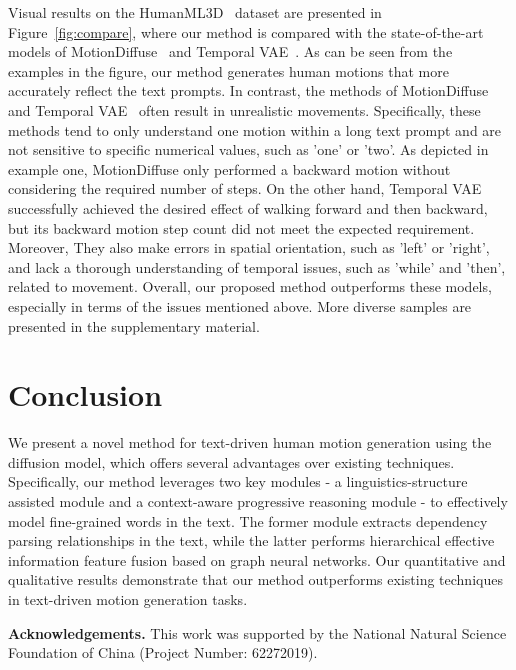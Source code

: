 \documentclass[10pt,twocolumn,letterpaper]{article}
\begin{document}
Visual results on the HumanML3D~\cite{guo2022generating} dataset are presented in Figure~\ref{fig:compare}, where our method is compared with the state-of-the-art models of MotionDiffuse~\cite{zhang2022motiondiffuse} and Temporal VAE~\cite{guo2022generating}. As can be seen from the examples in the figure, our method generates human motions that more accurately reflect the text prompts. In contrast, the methods of MotionDiffuse~\cite{zhang2022motiondiffuse} and Temporal VAE~\cite{guo2022generating} often result in unrealistic movements. Specifically, these methods tend to only understand one motion within a long text prompt and are not sensitive to specific numerical values, such as 'one' or 'two'. 
As depicted in example one, MotionDiffuse \cite{zhang2022motiondiffuse} only performed a backward motion without considering the required number of steps. On the other hand, Temporal VAE \cite{guo2022generating} successfully achieved the desired effect of walking forward and then backward, but its backward motion step count did not meet the expected requirement.
Moreover, They also make errors in spatial orientation, such as 'left' or 'right', and lack a thorough understanding of temporal issues, such as 'while' and 'then', related to movement. Overall, our proposed method outperforms these models, especially in terms of the issues mentioned above. More diverse samples are presented in the supplementary material.




\section{Conclusion}

We present a novel method for text-driven human motion generation using the diffusion model, which offers several advantages over existing techniques. Specifically, our method leverages two key modules - a linguistics-structure assisted module and a context-aware progressive reasoning module - to effectively model fine-grained words in the text. The former module extracts dependency parsing relationships in the text, while the latter performs hierarchical effective information feature fusion based on graph neural networks. Our quantitative and qualitative results demonstrate that our method outperforms existing techniques in text-driven motion generation tasks. 



\noindent \textbf{Acknowledgements.} This work was supported by the National Natural Science Foundation of China (Project Number: 62272019).


{\small


}
\end{document}
